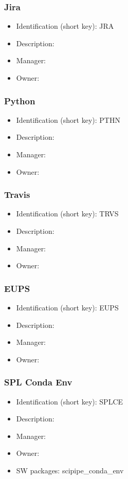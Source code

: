 \subsubsection{Jira}\label{sect:JRA}
\begin{itemize}
\item Identification (short key): JRA
\item Description: 
\item Manager: 
\item Owner: 
\end{itemize}

\subsubsection{Python}\label{sect:PTHN}
\begin{itemize}
\item Identification (short key): PTHN
\item Description: 
\item Manager: 
\item Owner: 
\end{itemize}

\subsubsection{Travis}\label{sect:TRVS}
\begin{itemize}
\item Identification (short key): TRVS
\item Description: 
\item Manager: 
\item Owner: 
\end{itemize}

\subsubsection{EUPS}\label{sect:EUPS}
\begin{itemize}
\item Identification (short key): EUPS
\item Description: 
\item Manager: 
\item Owner: 
\end{itemize}

\subsubsection{SPL Conda Env}\label{sect:SPLCE}
\begin{itemize}
\item Identification (short key): SPLCE
\item Description: 
\item Manager: 
\item Owner: 
\item SW packages: scipipe\_conda\_env
\end{itemize}

